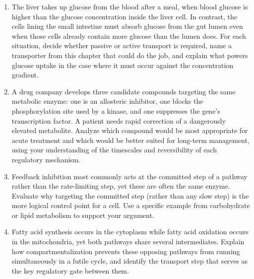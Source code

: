 \documentclass{tufte-handout}
\begin{document}
\begin{enumerate}

\item The liver takes up glucose from the blood after a meal, when blood glucose is higher than the glucose concentration inside the liver cell.  In contrast, the cells lining the small intestine must absorb glucose from the gut lumen even when those cells already contain more glucose than the lumen does.
  For each situation, decide whether passive or active transport is required, name a transporter from this chapter that could do the job, and explain what powers glucose uptake in the case where it must occur against the concentration gradient.

\item A drug company develops three candidate compounds targeting the same metabolic enzyme: one is an allosteric inhibitor, one blocks the phosphorylation site used by a kinase, and one suppresses the gene's transcription factor.
  A patient needs rapid correction of a dangerously elevated metabolite.
  Analyze which compound would be most appropriate for acute treatment and which would be better suited for long-term management, using your understanding of the timescales and reversibility of each regulatory mechanism.

\item Feedback inhibition most commonly acts at the committed step of a pathway rather than the rate-limiting step, yet these are often the same enzyme.
  Evaluate why targeting the committed step (rather than any slow step) is the more logical control point for a cell.
  Use a specific example from carbohydrate or lipid metabolism to support your argument.

\item Fatty acid synthesis occurs in the cytoplasm while fatty acid oxidation occurs in the mitochondria, yet both pathways share several intermediates.
  Explain how compartmentalization prevents these opposing pathways from running simultaneously in a futile cycle, and identify the transport step that serves as the key regulatory gate between them.

\end{enumerate}



\end{document}
